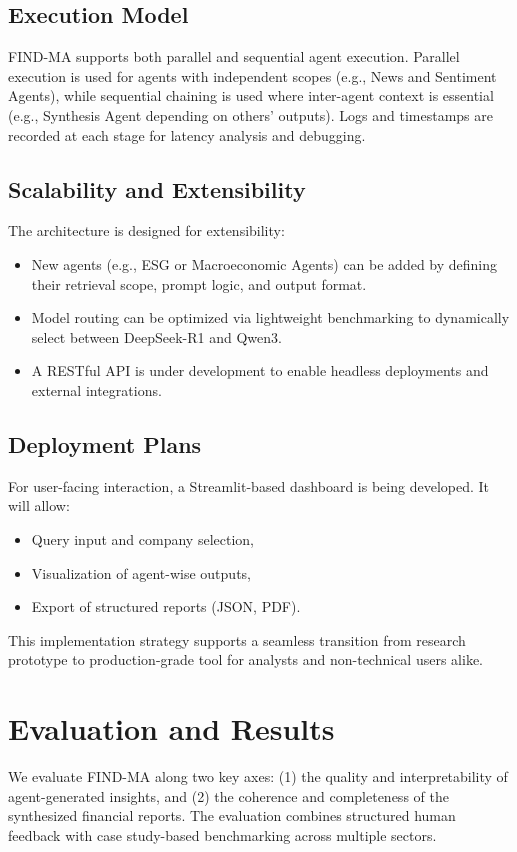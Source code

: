 \documentclass[11pt]{article}
\newcommand{\findma}{\textsc{FIND-MA}}
\begin{document}
\subsection*{Execution Model}
\findma{} supports both parallel and sequential agent execution. Parallel execution is used for agents with independent scopes (e.g., News and Sentiment Agents), while sequential chaining is used where inter-agent context is essential (e.g., Synthesis Agent depending on others’ outputs). Logs and timestamps are recorded at each stage for latency analysis and debugging.

\subsection*{Scalability and Extensibility}
The architecture is designed for extensibility:
\begin{itemize}
    \item New agents (e.g., ESG or Macroeconomic Agents) can be added by defining their retrieval scope, prompt logic, and output format.
    \item Model routing can be optimized via lightweight benchmarking to dynamically select between DeepSeek-R1 and Qwen3.
    \item A RESTful API is under development to enable headless deployments and external integrations.
\end{itemize}

\subsection*{Deployment Plans}
For user-facing interaction, a Streamlit-based dashboard is being developed. It will allow:
\begin{itemize}
    \item Query input and company selection,
    \item Visualization of agent-wise outputs,
    \item Export of structured reports (JSON, PDF).
\end{itemize}
This implementation strategy supports a seamless transition from research prototype to production-grade tool for analysts and non-technical users alike.

\section{Evaluation and Results}
\label{sec:evaluation}
We evaluate \findma{} along two key axes: (1) the quality and interpretability of agent-generated insights, and (2) the coherence and completeness of the synthesized financial reports. The evaluation combines structured human feedback with case study-based benchmarking across multiple sectors.
\end{document}
